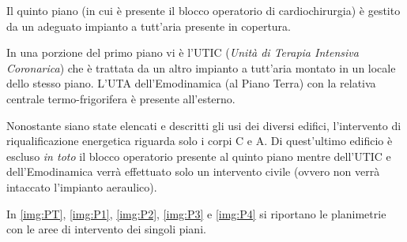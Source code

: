 Il quinto piano (in cui è presente il blocco operatorio di cardiochirurgia) è gestito da un adeguato impianto a tutt'aria presente in copertura.

In una porzione del primo piano vi è l'UTIC (\emph{Unità di Terapia Intensiva Coronarica}) che è trattata da un altro impianto a tutt'aria montato in un locale dello stesso piano. L'UTA dell'Emodinamica (al Piano Terra) con la relativa centrale termo-frigorifera è presente all'esterno.

Nonostante siano state elencati e descritti gli usi dei diversi edifici, l'intervento di riqualificazione energetica riguarda solo i corpi C e A. Di quest'ultimo edificio è escluso \emph{in toto} il blocco operatorio presente al quinto piano mentre dell'UTIC e dell'Emodinamica verrà effettuato solo un intervento civile (ovvero non verrà intaccato l'impianto aeraulico).

In \vref{img:PT}, \vref{img:P1}, \vref{img:P2}, \vref{img:P3} e \vref{img:P4} si riportano le planimetrie con le aree di intervento dei singoli piani.


